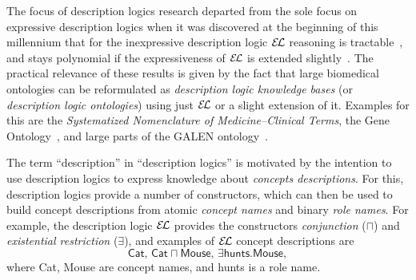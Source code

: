 The focus of description logics research departed from the sole focus on expressive
description logics when it was discovered at the beginning of this millennium that for the
inexpressive description logic ${\mathcal{E}\kern-.3ex\mathcal{L}}$ reasoning is
tractable~\cite{DBLP:conf/ijcai/Baader03a,DBLP:conf/ecai/Brandt04}, and stays polynomial
if the expressiveness of ${\mathcal{E}\kern-.3ex\mathcal{L}}$ is extended
slightly~\cite{DBLP:conf/ijcai/BaaderBL05,BaaderEtAl-OWLED08DC}.  The practical relevance
of these results is given by the fact that large biomedical ontologies can be reformulated
as \emph{description logic knowledge bases} (or \emph{description logic ontologies}) using
just ${\mathcal{E}\kern-.3ex\mathcal{L}}$ or a slight extension of it.  Examples for this are the \emph{Systematized
  Nomenclature of Medicine--Clinical Terms}, the Gene Ontology~\cite{gene-ontology}, and
large parts of the GALEN ontology~\cite{Rector199475}.

The term \enquote{description} in \enquote{description logics} is motivated by the
intention to use description logics to express knowledge about \emph{concepts
  descriptions}.  For this, description logics provide a number of constructors, which can
then be used to build concept descriptions from atomic \emph{concept names} and binary
\emph{role names}.  For example, the description logic ${\mathcal{E}\kern-.3ex\mathcal{L}}$ provides the constructors
\emph{conjunction} ($\sqcap$) and \emph{existential restriction} ($\exists$), and examples
of ${\mathcal{E}\kern-.3ex\mathcal{L}}$ concept descriptions are
\begin{equation*}
  \mathsf{Cat},\, \mathsf{Cat} \sqcap \mathsf{Mouse},\, \exists \mathsf{hunts}. \mathsf{Mouse},
\end{equation*}
where \textsf{Cat}, \textsf{Mouse} are concept names, and \textsf{hunts} is a role name.


